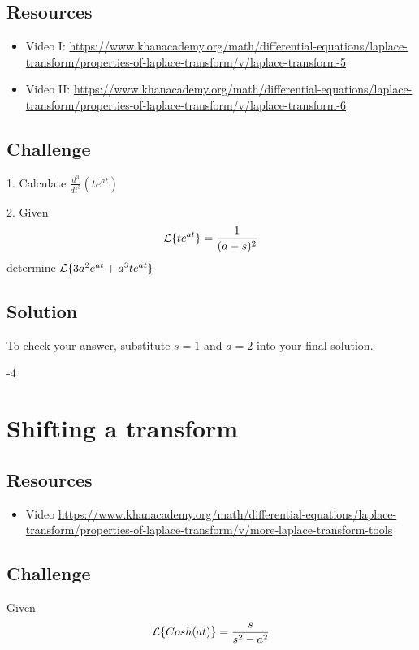 \subsection*{Resources}
\begin{itemize} %
    \item Video I: \url{https://www.khanacademy.org/math/differential-equations/laplace-transform/properties-of-laplace-transform/v/laplace-transform-5} %
    \item Video II: \url{https://www.khanacademy.org/math/differential-equations/laplace-transform/properties-of-laplace-transform/v/laplace-transform-6} %
\end{itemize}

\subsection*{Challenge}
1. Calculate $\displaystyle \frac{d^3}{dt^3} \left( t e^{a t} \right)$

2. Given
\begin{equation}
    \mathcal{L}\{t e^{a t}\} = \frac{1}{(a-s)^2}
\end{equation}
determine $\mathcal{L}\{3a^2 e^{at} + a^3te^{at}\}$

\subsection*{Solution}
To check your answer, substitute $s=1$ and $a=2$ into your final solution.

-4




\newpage
\section{Shifting a transform}

\subsection*{Resources}
\begin{itemize}
    \item Video \url{https://www.khanacademy.org/math/differential-equations/laplace-transform/properties-of-laplace-transform/v/more-laplace-transform-tools} %
\end{itemize}

\subsection*{Challenge}
Given
\begin{equation}
    \mathcal{L}\{Cosh(at)\} = \frac{s}{s^2-a^2}
\end{equation}

